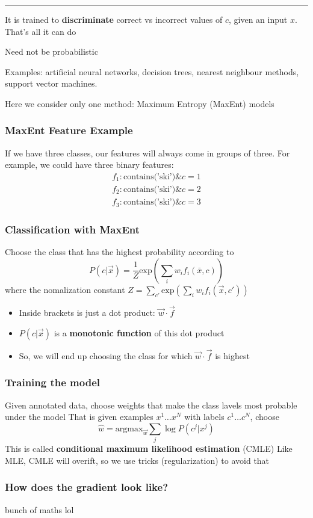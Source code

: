 \documentclass{article}
\begin{document}
\noindent\rule{\textwidth}{0.2pt}
It is trained to \textbf{discriminate} correct vs incorrect values of $c$, given an input $x$. That's all it can do

Need not be probabilistic

Examples: artificial neural networks, decision trees, nearest neighbour methods, support vector machines.

Here we consider only one method: Maximum Entropy (MaxEnt) models

\subsubsection{MaxEnt Feature Example}
If we have three classes, our features will always come in groups of three. For example, we could have three binary features:
\begin{align*}
   f_{1} : \text{contains('ski')} \& c = 1 \\
   f_{2} : \text{contains('ski')} \& c = 2 \\
   f_{3} : \text{contains('ski')} \& c = 3
\end{align*}


\subsubsection{Classification with MaxEnt}
Choose the class that has the highest probability according to
\[P(c| \vec{x}) = \frac{1}{Z} \text{exp}\left(\sum_{i}^{} w_{i} f_{i}(\bar{x}, c)\right)\] 
where the nomalization constant $Z = \sum_{c'} \text{exp}(\sum_{i}w_{i}f_{i}(\vec{x}, c'))$
\begin{itemize}
   \item Inside brackets is just a dot product: $\vec{w} \cdot \vec{f}$
   \item $P(c| \vec{x})$ is a \textbf{monotonic function} of this dot product
   \item So, we will end up choosing the class for which $\vec{w} \cdot \vec{f}$ is highest
\end{itemize}

\subsubsection{Training the model}
Given annotated data, choose weights that make the class lavels most probable under the model
That is given examples $x^{1} \dots x^{N}$ with labels $c^{1} \dots c^{N}$, choose
\[\hat{w} = \text{argmax}_{\vec{w}} \sum_{j} \log P(c^{j} | x^{j})\]
This is called \textbf{conditional maximum likelihood estimation} (CMLE)
Like MLE, CMLE will overift, so we use tricks (regularization) to avoid that

\subsubsection{How does the gradient look like?}
bunch of maths lol
\end{document}
